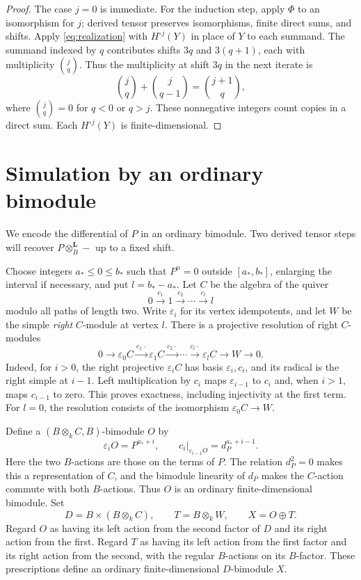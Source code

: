 \documentclass[11pt]{article}
\numberwithin{equation}{section}
\theoremstyle{definition}
\theoremstyle{remark}
\newcommand{\otL}{\otimes^{\mathbf L}}
\begin{document}
\begin{proof}
The case \(j=0\) is immediate.  For the induction step, apply
\(\Phi\) to an isomorphism for \(j\); derived tensor preserves
isomorphisms, finite direct sums, and shifts.  Apply
\eqref{eq:realization} with \(H^{\circ j}(Y)\) in place of \(Y\) to each
summand. The summand indexed by $q$ contributes shifts $3q$ and
$3(q+1)$, each with multiplicity $\binom jq$. Thus the multiplicity
at shift $3q$ in the next iterate is
\[
 \binom jq+\binom j{q-1}=\binom{j+1}q,
\]
where $\binom jq=0$ for $q<0$ or $q>j$.
These nonnegative integers count copies in a direct sum.
Each $H^{\circ j}(Y)$ is finite-dimensional.

\end{proof}

\section{Simulation by an ordinary bimodule}
\label{sec:ordinary-simulation}

We encode the differential of $P$ in an ordinary bimodule. Two
derived tensor steps will recover $P\otL_B-$ up to a fixed shift.

Choose integers \(a_*\le 0\le b_*\) such that \(P^n=0\) outside
\([a_*,b_*]\), enlarging the interval if necessary, and put
\(l=b_*-a_*\).
Let \(C\) be the algebra of the quiver
\[
0\xrightarrow{c_1}1\xrightarrow{c_2}\cdots
\xrightarrow{c_l}l
\]
modulo all paths of length two.
Write \(\varepsilon_i\) for its vertex idempotents, and let \(W\)
be the simple \emph{right} \(C\)-module at vertex \(l\).
There is a projective resolution of right \(C\)-modules
\begin{equation}
\label{eq:right-chain-resolution}
0\longrightarrow \varepsilon_0C
\xrightarrow{c_1\cdot}\varepsilon_1C
\xrightarrow{c_2\cdot}\cdots
\xrightarrow{c_l\cdot}\varepsilon_lC
\longrightarrow W\longrightarrow0.
\end{equation}
Indeed, for \(i>0\), the right projective \(\varepsilon_iC\)
has basis \(\varepsilon_i,c_i\), and its radical is the right
simple at \(i-1\).  Left multiplication by \(c_i\) maps
\(\varepsilon_{i-1}\) to \(c_i\) and, when \(i>1\), maps
\(c_{i-1}\) to zero.  This proves exactness, including injectivity
at the first term.  For \(l=0\), the resolution consists of
the isomorphism \(\varepsilon_0C\to W\).

Define a \((B\otimes_k C,B)\)-bimodule \(O\) by
\[
\varepsilon_iO=P^{a_*+i},
\qquad
c_i\big|_{\varepsilon_{i-1}O}=d_P^{a_*+i-1}.
\]
Here the two \(B\)-actions are those on the terms of \(P\).
The relation \(d_P^2=0\) makes this a representation of \(C\),
and the bimodule linearity of \(d_P\) makes the \(C\)-action
commute with both \(B\)-actions.  Thus \(O\) is an ordinary
finite-dimensional bimodule.  Set
\[
D=B\times(B\otimes_k C),\qquad
T=B\otimes_k W,\qquad X=O\oplus T.
\]
Regard \(O\) as having its left action from the second factor
of \(D\) and its right action from the first.  Regard \(T\)
as having its left action from the first factor and its
right action from the second, with the regular \(B\)-actions
on its \(B\)-factor.  These prescriptions define an ordinary
finite-dimensional \(D\)-bimodule \(X\).
\end{document}
